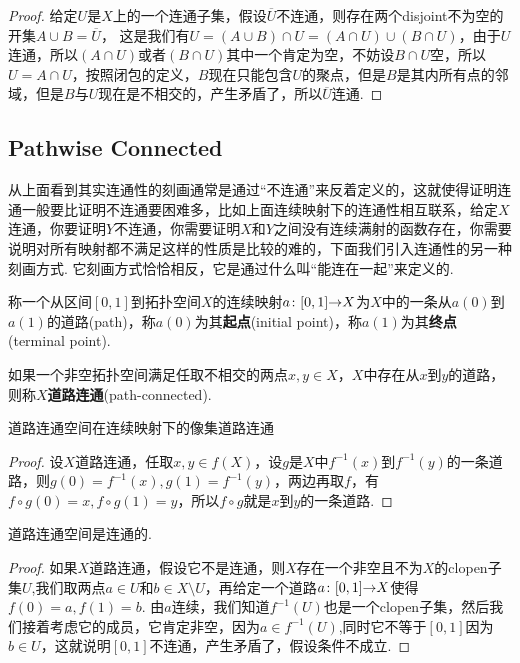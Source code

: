 \begin{proof}
给定$U$是$X$上的一个连通子集，假设$\overline{U}$不连通，则存在两个disjoint不为空的开集$A \cup B = \overline{U}$， 这是我们有$U = (A \cup B) \cap U = (A \cap U) \cup (B \cap U)$，由于$U$连通，所以$(A \cap U)$或者$(B \cap U)$其中一个肯定为空，不妨设$B \cap U$空，所以$U = A \cap U$，按照闭包的定义，$B$现在只能包含$U$的聚点，但是$B$是其内所有点的邻域，但是$B$与$U$现在是不相交的，产生矛盾了，所以$\overline{U}$连通.
\end{proof}

\newpage
\subsection{Pathwise Connected}

从上面看到其实连通性的刻画通常是通过“不连通”来反着定义的，这就使得证明连通一般要比证明不连通要困难多，比如上面连续映射下的连通性相互联系，给定$X$连通，你要证明$Y$不连通，你需要证明$X$和$Y$之间没有连续满射的函数存在，你需要说明对所有映射都不满足这样的性质是比较的难的，下面我们引入连通性的另一种刻画方式. 它刻画方式恰恰相反，它是通过什么叫“能连在一起”来定义的.

\begin{definition}
\rm 称一个从区间$[0,1]$到拓扑空间$X$的连续映射${a}\colon{[0,1]}{\to}{X}$为$X$中的一条从$a(0)$到$a(1)$的道路(path)，称$a(0)$为其\textbf{起点}(initial point)，称$a(1)$为其\textbf{终点}(terminal point).
\end{definition}

\begin{definition}
\rm 如果一个非空拓扑空间满足任取不相交的两点$x,y \in X$，$X$中存在从$x$到$y$的道路，则称$X$\textbf{道路连通}(path-connected).
\end{definition}

\begin{proposition}
道路连通空间在连续映射下的像集道路连通
\end{proposition}

\begin{proof}
设$X$道路连通，任取$x,y \in f(X)$，设$g$是$X$中$f^{-1}(x)$到$f^{-1}(y)$的一条道路，则$g(0)=f^{-1}(x),g(1)=f^{-1}(y)$，两边再取$f$，有$f \circ g(0) = x,f \circ g(1) = y$，所以$f \circ g$就是$x$到$y$的一条道路.
\end{proof}

\begin{proposition}
道路连通空间是连通的.
\end{proposition}

\begin{proof}
如果$X$道路连通，假设它不是连通，则$X$存在一个非空且不为$X$的clopen子集$U$,我们取两点$a \in U$和$b \in X \setminus U$，再给定一个道路${a}\colon{[0,1]}{\to}{X}$使得$f(0)=a,f(1)=b$. 由$a$连续，我们知道$f^{-1}(U)$也是一个clopen子集，然后我们接着考虑它的成员，它肯定非空，因为$a \in f^{-1}(U)$,同时它不等于$[0,1]$因为$b \in U$，这就说明$[0,1]$不连通，产生矛盾了，假设条件不成立.
\end{proof}

